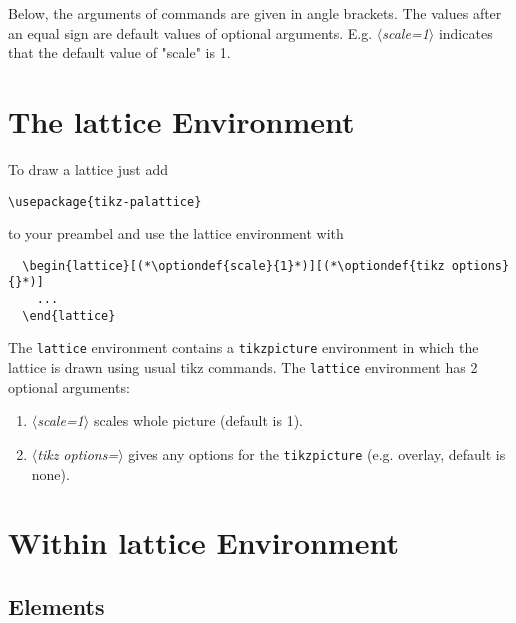 \documentclass[a4paper]{scrartcl}
\newcommand{\optiondef}[2]{{\color{green!50!black}$\langle$\textit{#1=#2}$\rangle$}}
\begin{document}
Below, the arguments of commands are given in angle brackets. The values after an equal
sign are default values of optional arguments. E.g. \optiondef{scale}{1} indicates that
the default value of "scale" is 1.



\section{The lattice Environment}
\label{sec-4}

To draw a lattice just add
\begin{lstlisting}
\usepackage{tikz-palattice}
\end{lstlisting}
to your preambel and use the lattice environment with
\begin{lstlisting}
  \begin{lattice}[(*\optiondef{scale}{1}*)][(*\optiondef{tikz options}{}*)]
    ...
  \end{lattice}
\end{lstlisting}
The \lstinline+lattice+ environment contains a \lstinline+tikzpicture+ environment in
which the lattice is drawn using usual tikz commands. The \lstinline+lattice+ environment
has 2 optional arguments:
\begin{enumerate}
\item \optiondef{scale}{1} scales whole picture (default is 1).
\item \optiondef{tikz options}{} gives any options for the \lstinline+tikzpicture+ (e.g.
  overlay, default is none).
\end{enumerate}


\section{Within lattice Environment}
\label{sec-5}

\subsection{Elements}
\label{sec-5-1}
\end{document}
